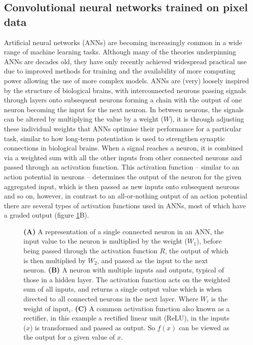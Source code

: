 \documentclass[a4paper,11pt,twoside,openright]{scrbook}
\begin{document}


\subsection{Convolutional neural networks trained on pixel data}
Artificial neural networks (ANNs) are becoming increasingly common in a wide range of machine learning tasks.
Although many of the theories underpinning ANNs are decades old, \cite{Rosenblatt1958} they have only recently achieved widespread practical use due to improved methods for training \cite{Rumelhart1986} and the availability of more computing power allowing the use of more complex models.
ANNs are (very) loosely inspired by the structure of biological brains, with interconnected neurons passing signals through layers onto subsequent neurons forming a chain with the output of one neuron becoming the input for the next neuron.
In between neurons, the signals can be altered by multiplying the value by a weight ($W$), it is through adjusting these individual weights that ANNs optimise their performance for a particular task, similar to how long-term potentiation is used to strengthen synaptic connections in biological brains.
When a signal reaches a neuron, it is combined via a weighted sum with all the other inputs from other connected neurons and passed through an activation function.
This activation function -- similar to an action potential in neurons -- determines the output of the neuron for the given aggregated input, which is then passed as new inputs onto subsequent neurons and so on, however, in contrast to an all-or-nothing output of an action potential there are several types of activation functions used in ANNs, most of which have a graded output (figure \ref{figure:neuron_relu}B).

\begin{figure}
    \captionsetup{width=0.9\textwidth}
    \caption[Diagram neural network neuron and activation function.]{\textbf{(A)} A representation of a single connected neuron in an ANN, the input value to the neuron is multiplied by the weight ($W_1$), before being passed through the activation function $R$, the output of which is then multiplied by $W_2$, and passed as the input to the next neuron. \textbf{(B)} A neuron with multiple inputs and outputs, typical of those in a hidden layer. The activation function acts on the weighted sum of all inputs, and returns a single output value which is when directed to all connected neurons in the next layer. Where $W_i$ is the weight of \textsf{input}$_i$. \textbf{(C)} A common activation function also known as a rectifier, in this example a rectified linear unit (ReLU), in the inputs ($x$) is transformed and passed as output. So $f(x)$ can be viewed as the output for a given value of $x$.}
    \label{figure:neuron_relu}

\end{figure}
\end{document}
